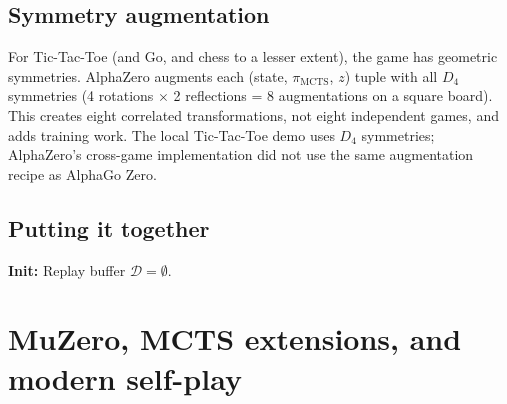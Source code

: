\documentclass[11pt,oneside]{scrbook}
\begin{document}
\section{Symmetry augmentation}

For Tic-Tac-Toe (and Go, and chess to a lesser extent), the game has
geometric symmetries. AlphaZero augments each (state, $\pi_{\mathrm{MCTS}}$,
$z$) tuple with all $D_4$ symmetries (4 rotations $\times$ 2 reflections =
8 augmentations on a square board). This creates eight correlated transformations, not eight independent
games, and adds training work. The local Tic-Tac-Toe demo uses $D_4$
symmetries; AlphaZero's cross-game implementation did not use the same
augmentation recipe as AlphaGo Zero.

\section{Putting it together}

\begin{algorithm}[H]
\caption{AlphaZero training loop}\label{alg:az}
\DontPrintSemicolon
{}
\textbf{Init:} Replay buffer $\mathcal{D} = \emptyset$.\;
\end{algorithm}

\chapter{MuZero, MCTS extensions, and modern self-play}
\end{document}
